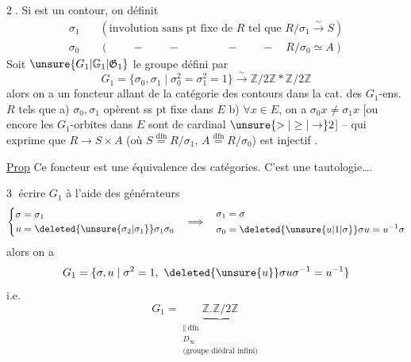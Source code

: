 \textcircled{\small 2.} Si
est un contour, on définit
\[
\begin{aligned}
\sigma_1&\quad(\text{involution sans pt fixe de }R\text{ tel que }R/\sigma_1\xrightarrow{\sim}S)\\
\sigma_0&\quad(\qquad-\qquad-\qquad\qquad-\qquad-\quad R/\sigma_0\simeq A)
\end{aligned}
\]
Soit $\unsure{G_1|\mathbb G_1|\mathfrak G_1}$ le groupe défini par
\[
G_1=\{\sigma_0,\sigma_1\mid\sigma_0^2=\sigma_1^2=1\}\xrightarrow{\sim}\mathbb Z/2\mathbb Z*\mathbb Z/2\mathbb Z
\]
alors on a un foncteur allant de la
catégorie des contours dans la cat. des $G_1$-ens.
$R$ tels que \quad a) $\sigma_0,\sigma_1$ opèrent ss pt fixe dans $E$
b) $\forall x\in E$, on a $\sigma_0x\ne\sigma_1x$ [ou encore les $G_1$-orbites
dans $E$ sont de cardinal $\unsure{>|\geq|\to}2$] -- qui exprime
que $R\to S\times A$ (où $S\overset{\mathrm{dfn}}=R/\sigma_1$, $A\overset{\mathrm{dfn}}=R/\sigma_0$) est
injectif\unsure{)|]} .

\uline{Prop} Ce foncteur
est une équivalence des catégories.
C'est une tautologie\ldots.

\textcircled{\small 3}  écrire $G_1$  à l'aide des
générateurs 
\[
\left\{\begin{aligned}\sigma&=\sigma_1\\u&=\deleted{\unsure{\sigma_2|\sigma_1}}\sigma_1\sigma_0\end{aligned}\right.
\quad\Longrightarrow\quad
\begin{aligned}\sigma_1&=\sigma\\\sigma_0&=\deleted{\unsure{u|1|\sigma}}\sigma u=u^{-1}\sigma\end{aligned}
\]
alors on a
\[
G_1=\{\sigma,u\mid\sigma^2=1,\ \deleted{\unsure{u}}\sigma u\sigma^{-1}=u^{-1}\}
\]
i.e.
\[
G_1=\underbrace{\mathbb Z.\mathbb Z/2\mathbb Z}_{\substack{\Vert\ \mathrm{dfn}\\D_\infty\\\text{(groupe diédral infini)}}}
\]

